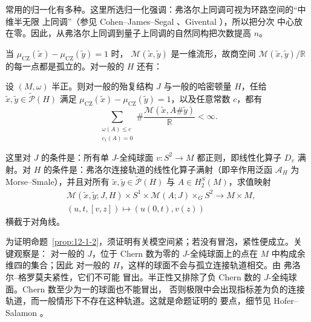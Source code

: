 \begin{remark}\label{rem:12-1-1}
常用的归一化有多种。这里所选归一化强调：弗洛尔上同调可视为环路空间的“中维半无限
上同调”（参见 Cohen--James--Segal 、Givental ），所以把分次
中心放在零。因此，从弗洛尔上同调到量子上同调的自然同构把次数提高 $n$。
\end{remark}

当 $\mu_{\mathrm{CZ}}(\widetilde x)-\mu_{\mathrm{CZ}}(\widetilde y)=1$ 时，
$\mathcal M(\widetilde x,\widetilde y)$ 是一维流形，故商空间
$\mathcal M(\widetilde x,\widetilde y)/\mathbb R$ 的每一点都是孤立的。对一般的 $H$ 还有：

\begin{proposition}\label{prop:12-1-2}
设 $(M,\omega)$ 半正。则对一般的殆复结构 $J$ 与一般的哈密顿量 $H$，任给
$\widetilde x,\widetilde y\in\widetilde{\mathcal P}(H)$ 满足
$\mu_{\mathrm{CZ}}(\widetilde x)-\mu_{\mathrm{CZ}}(\widetilde y)=1$，以及任意常数 $c$，都有
\[
  \sum_{\substack{\omega(A)\leq c\\c_1(A)=0}}
  \#\frac{\mathcal M(\widetilde x,A\#\widetilde y)}{\mathbb R}<\infty.
\]
\end{proposition}

这里对 $J$ 的条件是：所有单 $J$-全纯球面 $v:S^2\to M$ 都正则，即线性化算子 $D_v$
满射。对 $H$ 的条件是：弗洛尔连接轨道的线性化算子满射（即辛作用泛函
$\mathcal A_H$ 为 Morse--Smale），并且对所有
$\widetilde x,\widetilde y\in\widetilde{\mathcal P}(H)$ 与 $A\in H_2^S(M)$，求值映射
\[
\begin{split}
  &\mathcal M(\widetilde x,\widetilde y;J,H)\times S^1
  \times\mathcal M(A;J)\times_GS^2\longrightarrow M\times M,\\
  &(u,t,[v,z])\longmapsto(u(0,t),v(z))
\end{split}
\]
横截于对角线。

为证明命题~\ref{prop:12-1-2}，须证明有关模空间紧；若没有冒泡，紧性便成立。关键观察是：
对一般的 $J$，位于 Chern 数为零的 $J$-全纯球面上的点在 $M$ 中构成余维四的集合；因此
对一般的 $H$，这样的球面不会与孤立连接轨道相交。由 弗洛尔--格罗莫夫紧性，它们不可能
冒出。半正性又排除了负 Chern 数的 $J$-全纯球面。Chern 数至少为一的球面也不能冒出，
否则极限中会出现指标差为负的连接轨道，而一般情形下不存在这种轨道。这就是命题证明的
要点，细节见 Hofer--Salamon 。

